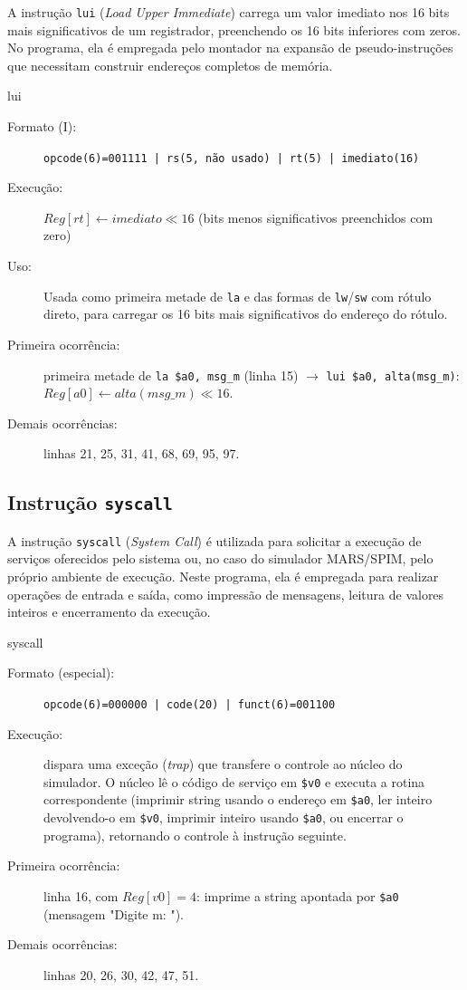 A instrução \texttt{lui} (\textit{Load Upper Immediate}) carrega um valor
imediato nos 16 bits mais significativos de um registrador, preenchendo os
16 bits inferiores com zeros. No programa, ela é empregada pelo montador na
expansão de pseudo-instruções que necessitam construir endereços completos
de memória.

\begin{instrucao}{lui}
\begin{description}
\item[Formato (I):] \texttt{opcode(6)=001111 | rs(5, não usado) | rt(5) | imediato(16)}
\item[Execução:] $Reg[rt] \leftarrow imediato \ll 16$
(bits menos significativos preenchidos com zero)
\item[Uso:] Usada como primeira metade de \texttt{la} e das formas de
\texttt{lw}/\texttt{sw} com rótulo direto, para carregar os 16 bits mais
significativos do endereço do rótulo.
\item[Primeira ocorrência:] primeira metade de
\texttt{la \$a0, msg\_m} (linha 15) $\rightarrow$
\texttt{lui \$a0, alta(msg\_m)}:
$Reg[a0] \leftarrow alta(msg\_m) \ll 16$.
\item[Demais ocorrências:] linhas 21, 25, 31, 41, 68, 69, 95, 97.
\end{description}
\end{instrucao}

\subsection{Instrução \texttt{syscall}}

A instrução \texttt{syscall} (\textit{System Call}) é utilizada para
solicitar a execução de serviços oferecidos pelo sistema ou, no caso
do simulador MARS/SPIM, pelo próprio ambiente de execução. 
Neste programa, ela é empregada para realizar operações de entrada
e saída, como impressão de mensagens, leitura de valores inteiros
e encerramento da execução.

\begin{instrucao}{syscall}
\begin{description}
\item[Formato (especial):] \texttt{opcode(6)=000000 | code(20) | funct(6)=001100}
\item[Execução:] dispara uma exceção (\textit{trap}) que transfere o
controle ao núcleo do simulador. O núcleo lê o código de serviço em
\texttt{\$v0} e executa a rotina correspondente (imprimir string usando o
endereço em \texttt{\$a0}, ler inteiro devolvendo-o em \texttt{\$v0},
imprimir inteiro usando \texttt{\$a0}, ou encerrar o programa), retornando
o controle à instrução seguinte.
\item[Primeira ocorrência:] linha 16, com $Reg[v0] = 4$: imprime a
string apontada por \texttt{\$a0} (mensagem "Digite m: ").
\item[Demais ocorrências:] linhas 20, 26, 30, 42, 47, 51.
\end{description}
\end{instrucao}

